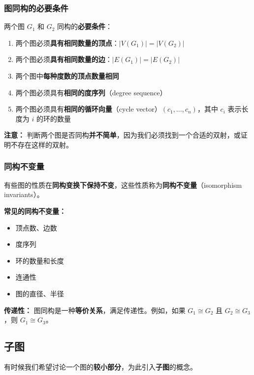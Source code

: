 \documentclass[12pt, a4paper]{article}
\begin{document}
\subsubsection{图同构的必要条件}

两个图 $G_1$ 和 $G_2$ 同构的\textbf{必要条件}：
\begin{enumerate}
    \item 两个图必须\textbf{具有相同数量的顶点}：$|V(G_1)| = |V(G_2)|$
    \item 两个图必须\textbf{具有相同数量的边}：$|E(G_1)| = |E(G_2)|$
    \item 两个图中\textbf{每种度数的顶点数量相同}
    \item 两个图必须具有\textbf{相同的度序列}（degree sequence）
    \item 两个图必须具有\textbf{相同的循环向量}（cycle vector）$(c_1, \dots, c_n)$，其中 $c_i$ 表示长度为 $i$ 的环的数量
\end{enumerate}

\textbf{注意：} 判断两个图是否同构\textbf{并不简单}，因为我们必须找到一个合适的双射，或证明不存在这样的双射。

\subsubsection{同构不变量}

有些图的性质在\textbf{同构变换下保持不变}，这些性质称为\textbf{同构不变量}（isomorphism invariants）。

\textbf{常见的同构不变量：}
\begin{itemize}
    \item 顶点数、边数
    \item 度序列
    \item 环的数量和长度
    \item 连通性
    \item 图的直径、半径
\end{itemize}

\textbf{传递性：} 图同构是一种\textbf{等价关系}，满足传递性。例如，如果 $G_1 \cong G_2$ 且 $G_2 \cong G_3$，则 $G_1 \cong G_3$。


\newpage
\subsection{子图}

有时候我们希望讨论一个图的\textbf{较小部分}，为此引入\textbf{子图}的概念。
\end{document}

